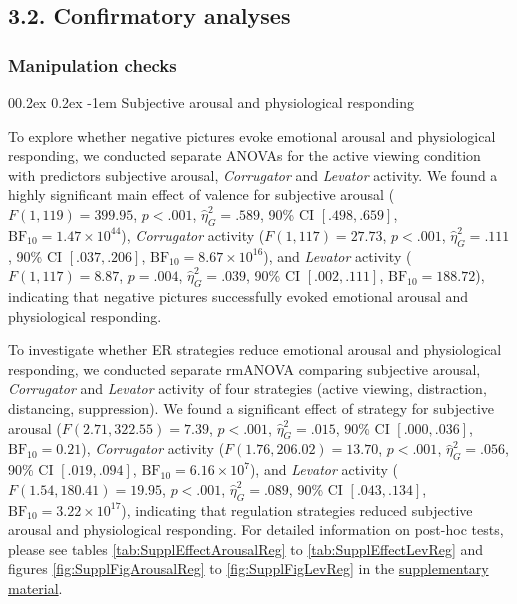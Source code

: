 \documentclass[
  man,floatsintext]{apa6}
\makeatletter
\let\oldparagraph\paragraph
\renewcommand{\paragraph}[1]{\oldparagraph{#1}\mbox{}}
\renewcommand{\paragraph}{\@startsection{paragraph}{4}{\parindent}%
  {0\baselineskip \@plus 0.2ex \@minus 0.2ex}%
  {-1em}%
  {\normalfont\normalsize\bfseries\itshape\typesectitle}}
\makeatother
\begin{document}
\hypertarget{confirmatory-analyses}{%
\subsection{3.2. Confirmatory analyses}\label{confirmatory-analyses}}

\hypertarget{manipulation-checks}{%
\subsubsection{Manipulation checks}\label{manipulation-checks}}

\hypertarget{subjective-arousal-and-physiological-responding}{%
\paragraph{Subjective arousal and physiological responding}\label{subjective-arousal-and-physiological-responding}}

To explore whether negative pictures evoke emotional arousal and physiological responding, we conducted separate ANOVAs for the active viewing condition with predictors subjective arousal, \emph{Corrugator} and \emph{Levator} activity.
We found a highly significant main effect of valence for subjective arousal (\(F(1, 119) = 399.95\), \(p < .001\), \(\hat{\eta}^2_G = .589\), 90\% CI \([.498, .659]\), \(\mathrm{BF}_{\textrm{10}} = 1.47 \times 10^{44}\)), \emph{Corrugator} activity (\(F(1, 117) = 27.73\), \(p < .001\), \(\hat{\eta}^2_G = .111\), 90\% CI \([.037, .206]\), \(\mathrm{BF}_{\textrm{10}} = 8.67 \times 10^{16}\)), and \emph{Levator} activity (\(F(1, 117) = 8.87\), \(p = .004\), \(\hat{\eta}^2_G = .039\), 90\% CI \([.002, .111]\), \(\mathrm{BF}_{\textrm{10}} = 188.72\)), indicating that negative pictures successfully evoked emotional arousal and physiological responding.

To investigate whether ER strategies reduce emotional arousal and physiological responding, we conducted separate rmANOVA comparing subjective arousal, \emph{Corrugator} and \emph{Levator} activity of four strategies (active viewing, distraction, distancing, suppression).
We found a significant effect of strategy for subjective arousal (\(F(2.71, 322.55) = 7.39\), \(p < .001\), \(\hat{\eta}^2_G = .015\), 90\% CI \([.000, .036]\), \(\mathrm{BF}_{\textrm{10}} = 0.21\)), \emph{Corrugator} activity (\(F(1.76, 206.02) = 13.70\), \(p < .001\), \(\hat{\eta}^2_G = .056\), 90\% CI \([.019, .094]\), \(\mathrm{BF}_{\textrm{10}} = 6.16 \times 10^{7}\)), and \emph{Levator} activity (\(F(1.54, 180.41) = 19.95\), \(p < .001\), \(\hat{\eta}^2_G = .089\), 90\% CI \([.043, .134]\), \(\mathrm{BF}_{\textrm{10}} = 3.22 \times 10^{17}\)), indicating that regulation strategies reduced subjective arousal and physiological responding.
For detailed information on post-hoc tests, please see tables \ref{tab:SupplEffectArousalReg} to \ref{tab:SupplEffectLevReg} and figures \ref{fig:SupplFigArousalReg} to \ref{fig:SupplFigLevReg} in the \protect\hyperlink{SupplementEffectER}{supplementary material}.
\end{document}
